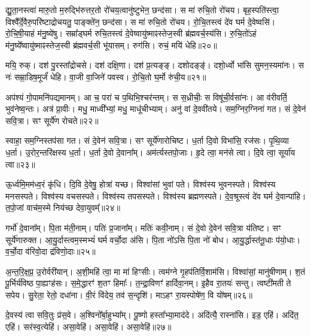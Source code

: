 द्यु॒ता॒नस्त्वा॑ मारु॒तो म॒रुद्भि॑रुत्तर॒तो रो॑चय॒त्वानु॑ष्टुभेन॒ छन्द॑सा। 
स मा॑ रुचि॒तो रो॑चय। 
बृह॒स्पति॑स्त्वा॒ विश्वै᳚र्दे॒वैरु॒परि॑ष्टाद्रोचयतु॒ पाङ्क्ते॑न॒ छन्द॑सा। 
स मा॑ रुचि॒तो रो॑चय। 
रो॒चि॒तस्त्वं दे॑व घर्म दे॒वेष्वसि॑। 
रो॒चि॒षी॒याहं म॑नु॒ष्ये॑षु। 
सम्रा᳚ड्घर्म रुचि॒तस्त्वं दे॒वेष्वायु॑ष्माꣴस्तेज॒स्वी ब्र॑ह्मवर्च॒स्य॑सि। 
रु॒चि॒तो॑ऽहं म॑नु॒ष्ये᳚ष्वायु॑ष्माꣴस्तेज॒स्वी ब्र॑ह्मवर्च॒सी भू॑यासम्। 
रुग॑सि। 
रुचं॒ मयि॑ धेहि॥२०॥

मयि॒ रुक्। 
दश॑ पु॒रस्ता᳚द्रोचसे। 
दश॑ दक्षि॒णा। 
दश॑ प्र॒त्यङ्ङ्। 
दशोदङ्ङ्॑। 
दशो॒र्ध्वो भा॑सि सुमन॒स्यमा॑नः। 
स नः॑ सम्रा॒डिष॒मूर्जं॑ धेहि। 
वा॒जी वा॒जिने॑ पवस्व। 
रो॒चि॒तो घ॒र्मो रु॑ची॒य॥२१॥
\anuvakamend[रो॒च॒य॒ धे॒हि॒ नव॑ च]

अप॑श्यं गो॒पामनि॑पद्यमानम्। 
आ च॒ परा॑ च प॒थिभि॒श्चर॑न्तम्। 
स स॒ध्रीचीः॒ स विषू॑ची॒र्वसा॑नः। 
आ व॑रीवर्ति॒ भुव॑नेष्व॒न्तः। 
अत्र॑ प्रा॒वीः। 
मधु॒ माध्वी᳚भ्यां॒ मधु॒ माधू॑चीभ्याम्। 
अनु॑ वां दे॒ववी॑तये। 
सम॒ग्निर॒ग्निना॑ गत। 
सं दे॒वेन॑ सवि॒त्रा। 
सꣳ सूर्ये॑ण रोचते॥२२॥

स्वाहा॒ सम॒ग्निस्तप॑सा गत। 
सं दे॒वेन॑ सवि॒त्रा। 
सꣳ सूर्ये॑णारोचिष्ट। 
ध॒र्ता दि॒वो विभा॑सि॒ रज॑सः। 
पृ॒थि॒व्या ध॒र्ता। 
उ॒रोर॒न्तरि॑क्षस्य ध॒र्ता। 
ध॒र्ता दे॒वो दे॒वाना᳚म्। 
अम॑र्त्यस्तपो॒जाः। 
हृ॒दे त्वा॒ मन॑से त्वा। 
दि॒वे त्वा॒ सूर्या॑य त्वा॥२३॥

ऊ॒र्ध्वमि॒मम॑ध्व॒रं कृ॑धि। 
दि॒वि दे॒वेषु॒ होत्रा॑ यच्छ। 
विश्वा॑सां भुवां पते। 
विश्व॑स्य भुवनस्पते। 
विश्व॑स्य मनसस्पते। 
विश्व॑स्य वचसस्पते। 
विश्व॑स्य तपसस्पते। 
विश्व॑स्य ब्रह्मणस्पते। 
दे॒व॒श्रूस्त्वं दे॑व घर्म दे॒वान्पा॑हि। 
त॒पो॒जां वाच॑म॒स्मे निय॑च्छ देवा॒युवम्᳚॥२४॥

गर्भो॑ दे॒वाना᳚म्। 
पि॒ता म॑ती॒नाम्। 
पतिः॑ प्र॒जाना᳚म्। 
मतिः॑ कवी॒नाम्। 
सं दे॒वो दे॒वेन॑ सवि॒त्रा य॑तिष्ट। 
सꣳ सूर्ये॑णारुक्त। 
आ॒यु॒र्दास्त्वम॒स्मभ्यं॑ घर्म वर्चो॒दा अ॑सि। 
पि॒ता नो॑ऽसि पि॒ता नो॑ बोध। 
आ॒यु॒र्द्धास्त॑नू॒धाः प॑यो॒धाः। 
व॒र्चो॒दा व॑रिवो॒दा द्र॑विणो॒दाः॥२५॥

अ॒न्त॒रि॒क्ष॒प्र॒ उ॒रोर्वरी॑यान्। 
अ॒शी॒महि॑ त्वा॒ मा मा॑ हिꣳसीः। 
त्वम॑ग्ने गृ॒हप॑तिर्वि॒शाम॑सि। 
विश्वा॑सां॒ मानु॑षीणाम्। 
श॒तं पू॒र्भिर्य॑विष्ठ पा॒ह्यꣳह॑सः। 
स॒मे॒द्धारꣳ॑ श॒तꣳ हिमाः᳚। 
त॒न्द्रा॒विणꣳ॑ हार्दिवा॒नम्। 
इ॒हैव रा॒तयः॑ सन्तु। 
त्वष्टी॑मती ते सपेय। 
सु॒रेता॒ रेतो॒ दधा॑ना। 
वी॒रं  वि॑देय॒ तव॑ स॒न्दृशि॑। 
माऽहꣳ रा॒यस्पोषे॑ण॒ वि यो॑षम्॥२६॥
\anuvakamend[रो॒च॒ते॒ सूर्या॑य त्वा देवा॒युवं॑ द्रविणो॒दा दधा॑ना॒ द्वे च॑]


दे॒वस्य॑ त्वा सवि॒तुः प्र॑स॒वे। 
अ॒श्विनो᳚र्बा॒हुभ्या᳚म्। 
पू॒ष्णो हस्ता᳚भ्या॒माद॑दे। 
अदि॑त्यै॒ रास्ना॑सि। 
इड॒ एहि॑। 
अदि॑त॒ एहि॑। 
सर॑स्व॒त्येहि॑। 
असा॒वेहि॑। 
असा॒वेहि॑। 
असा॒वेहि॑॥२७॥

